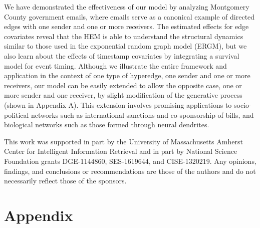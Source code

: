 \documentclass[ba]{imsart}
\numberwithin{equation}{section}
\theoremstyle{plain}
\begin{document}
	We have demonstrated the effectiveness of our model by analyzing Montgomery County government emails, where emails serve as a canonical example of directed edges with one sender and one or more receivers. The estimated effects for edge covariates reveal that the HEM is able to understand the structural dynamics similar to those used in the exponential random graph model (ERGM), but we also learn about the effects of timestamp covariates by integrating a survival model for event timing. Although we illustrate the entire framework and application in the context of one type of hyperedge, one sender and one or more receivers, our model can be easily extended to allow the opposite case, one or more sender and one receiver, by slight modification of the generative process (shown in Appendix A). This extension involves promising applications to socio-political networks such as international sanctions and co-sponsorship of bills, and biological networks such as those formed through neural dendrites. %
	\begin{acknowledgement}
		This work was supported in part by the University of Massachusetts Amherst Center for Intelligent Information Retrieval and in part by National Science Foundation grants DGE-1144860, SES-1619644, and CISE-1320219. Any opinions, findings, and conclusions or recommendations are those of the authors and do not necessarily reflect those of the
		sponsors.
	\end{acknowledgement}
	
	\section*{Appendix}
\end{document}
